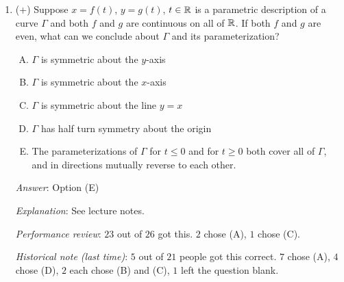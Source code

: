\documentclass[10pt]{amsart}
\begin{document}
\begin{enumerate}
  \begin{enumerate}[(A)]
  \item $x = \cos t$, $y = \sin t$, $t \in \R$
  \item $x = \cos t$, $y = \cos(3t)$, $t \in \R$
  \item $x = \cos t$, $y = \cos^2t$, $t \in \R$
  \item $x = \cos t$, $y = \cos(t^2)$, $t \in \R$
  \item None of the above, i.e., they are all algebraic
  \end{enumerate}

  {\em Answer}: Option (D)

  {\em Explanation}: In all the other cases, we can elucidate an
  algebraic relationship between the variables.

  For option (A), we can set both $\cos t$ and $\sin t$ as rational
  functions in $\tan(t/2)$. In fact, the rational functions in
  $\tan(t/2)$ approach works for options (B) and (C) as well, though
  there are simpler approaches in those cases. The approach does not
  work for option (D).

  {\em Performance review}: $12$ out of $26$ got this. $9$ chose (E),
  $3$ chose (A), $1$ each chose (B) and (C).

  {\em Historical note (last time)}: $11$ out of $21$ people got this
  correct. $8$ chose (E), $1$ chose (B), $1$ left the question blank.

\item (+) Suppose $x = f(t)$, $y = g(t)$, $t \in \R$ is a parametric
  description of a curve $\Gamma$ and both $f$ and $g$ are continuous
  on all of $\mathbb{R}$. If both $f$ and $g$ are even, what can we conclude
  about $\Gamma$ and its parameterization?

  \begin{enumerate}[(A)]
  \item $\Gamma$ is symmetric about the $y$-axis
  \item $\Gamma$ is symmetric about the $x$-axis
  \item $\Gamma$ is symmetric about the line $y = x$
  \item $\Gamma$ has half turn symmetry about the origin
  \item The parameterizations of $\Gamma$ for $t \le 0$ and for $t \ge
    0$ both cover all of $\Gamma$, and in directions mutually reverse
    to each other.
  \end{enumerate}

  {\em Answer}: Option (E)

  {\em Explanation}: See lecture notes.

  {\em Performance review}: $23$ out of $26$ got this. $2$ chose (A),
  $1$ chose (C).

  {\em Historical note (last time)}: $5$ out of $21$ people got this
  correct. $7$ chose (A), $4$ chose (D), $2$ each chose (B) and (C),
  $1$ left the question blank.

\end{enumerate}
\end{document}
